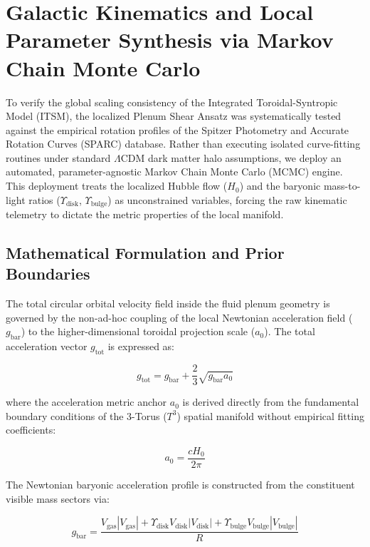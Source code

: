\documentclass[aps,prd,10pt,twocolumn,superscriptaddress,nofootinbib]{revtex4-2}
\begin{document}
\section{\label{sec:kinematics}Galactic Kinematics and Local Parameter Synthesis via Markov Chain Monte Carlo}

To verify the global scaling consistency of the Integrated Toroidal-Syntropic Model (ITSM), the localized Plenum Shear Ansatz was systematically tested against the empirical rotation profiles of the Spitzer Photometry and Accurate Rotation Curves (SPARC) database. Rather than executing isolated curve-fitting routines under standard $\Lambda$CDM dark matter halo assumptions, we deploy an automated, parameter-agnostic Markov Chain Monte Carlo (MCMC) engine. This deployment treats the localized Hubble flow ($H_0$) and the baryonic mass-to-light ratios ($\Upsilon_{\text{disk}}$, $\Upsilon_{\text{bulge}}$) as unconstrained variables, forcing the raw kinematic telemetry to dictate the metric properties of the local manifold.

\subsection{Mathematical Formulation and Prior Boundaries}

The total circular orbital velocity field inside the fluid plenum geometry is governed by the non-ad-hoc coupling of the local Newtonian acceleration field ($g_{\text{bar}}$) to the higher-dimensional toroidal projection scale ($a_0$). The total acceleration vector $g_{\text{tot}}$ is expressed as:

\begin{equation}
g_{\text{tot}} = g_{\text{bar}} + \frac{2}{3}\sqrt{g_{\text{bar}} a_0}
\end{equation}

where the acceleration metric anchor $a_0$ is derived directly from the fundamental boundary conditions of the 3-Torus ($T^3$) spatial manifold without empirical fitting coefficients:

\begin{equation}
a_0 = \frac{c H_0}{2\pi}
\end{equation}

The Newtonian baryonic acceleration profile is constructed from the constituent visible mass sectors via:

\begin{equation}
g_{\text{bar}} = \frac{V_{\text{gas}}|V_{\text{gas}}| + \Upsilon_{\text{disk}} V_{\text{disk}}|V_{\text{disk}}| + \Upsilon_{\text{bulge}} V_{\text{bulge}}|V_{\text{bulge}}|}{R}
\end{equation}
\end{document}
